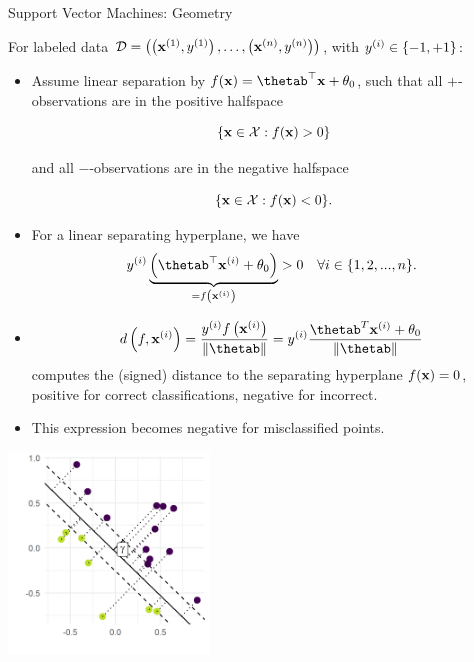 \documentclass[11pt,compress,t,notes=noshow, xcolor=table]{beamer}
\begin{document}





\begin{vbframe}{Support Vector Machines: Geometry}

For labeled data $\mathcal{D} = \left( \left(\mathbf{x}^{(1)}, y^{(1)}\right), \ldots, \left(\mathbf{x}^{(n)}, y^{(n)}\right)\right)$, with $y^{(i)} \in \{-1, +1\}$:
\begin{itemize}
  \item Assume linear separation by $\fx = \thetab^\top \xv + \theta_0$, such that all $+$-observations are in the positive halfspace

  $$
  \phantom{i}\{\mathbf{x} \in \mathcal{X}: f(\mathbf{x}) > 0\}
  $$

  and all $-$-observations are in the negative halfspace

  $$
  \phantom{i}\{\mathbf{x} \in \mathcal{X} : f(\mathbf{x}) < 0\}.
  $$

  \item For a linear separating hyperplane, we have
  $$
    \yi \underbrace{\left(\thetab^\top \xi + \theta_0\right)}_{= \fxi} > 0 \quad \forall i \in \{1, 2, ..., n\}.
  $$

  \item 
  $$
    d \left(f, \xi \right) = \frac{\yi \fxi}{\|\thetab\|} = \yi \frac{\thetab^T \xi + \theta_0}{\|\thetab\|}
  $$
  computes the (signed) distance to the separating hyperplane $f(\mathbf{x}) = 0$,
    positive for correct classifications, negative for incorrect.
  \item This expression becomes negative for misclassified points.
\end{itemize}


\begin{center}
\includegraphics[width=0.4\textwidth]{figure/svm_geometry.png} \\
\end{center}



\end{vbframe}
\end{document}

